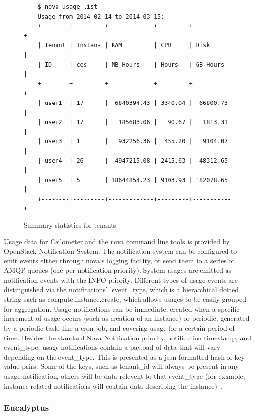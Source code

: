 \documentclass{sig-alternate-05-2015}
\begin{document}
\begin{figure}[htb]
\begin{scriptsize}
\begin{verbatim}
    $ nova usage-list
    Usage from 2014-02-14 to 2014-03-15:
    +--------+---------+-------------+---------+-----------+
    | Tenant | Instan- | RAM         | CPU     | Disk      |
    | ID     | ces     | MB-Hours    | Hours   | GB-Hours  |
    +--------+---------+-------------+---------+-----------+
    | user1  | 17      |  6840394.43 | 3340.04 |  66800.73 |
    | user2  | 17      |   185683.06 |   90.67 |   1813.31 |
    | user3  | 1       |   932256.36 |  455.20 |   9104.07 |
    | user4  | 26      |  4947215.08 | 2415.63 |  48312.65 |
    | user5  | 5       | 18644854.23 | 9103.93 | 182078.65 |
    +--------+---------+-------------+---------+-----------+
\end{verbatim}
\vspace{-20pt}
\end{scriptsize}

\caption{Summary statistics for tenants}
\label{F:host-describe}

\end{figure}


Usage data for Ceilometer and the nova command line tools is provided by OpenStack Notification System. The notification system can be configured to emit events either through nova's logging facility, or send them to a series of AMQP queues (one per notification priority). System usages are emitted as notification events with the INFO priority. Different types of usage events are distinguished via the notifications' 'event\_type, which is a hierarchical dotted string such as compute.instance.create, which allows usages to be easily grouped for aggregation. Usage notifications can be immediate, created when a specific increment of usage occurs (such as creation of an instance) or periodic, generated by a periodic task, like a cron job, and covering usage for a certain period of time. Besides the standard Nova Notification priority, notification timestamp, and event\_type, usage notifications contain a payload of data that will vary depending on the event\_type. This is presented as a json-formatted hash of key-value pairs. Some of the keys, such as tenant\_id will always be present in any usage notification, others will be data relevent to that event\_type (for example, instance related notifications will contain data describing the instance)~\cite{SystemUsageData}.

\subsubsection{Eucalyptus}
\end{document}
